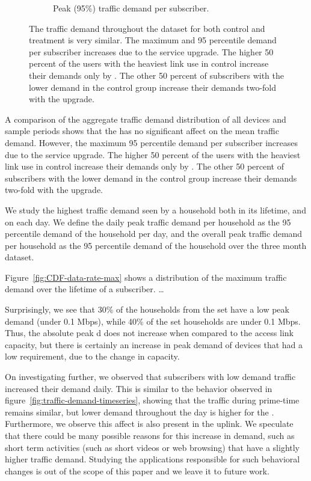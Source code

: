 \begin{figure}[t]
\begin{minipage}{1\linewidth}
\begin{subfigure}[b]{0.33\linewidth}
               \caption{Peak (95\%)
traffic demand per subscriber.\label{fig:CDF-data-rate-perc95}}
\end{subfigure}
%
\end{minipage}
\caption{The traffic demand throughout the dataset for both control and 
treatment is very similar. The maximum and 95 percentile 
demand per subscriber increases due to the service upgrade. The 
higher 50 percent of the users with the heaviest link use in control increase 
their demands only by . The other 50 percent of subscribers with the 
lower demand in the control group increase their demands two-fold with the 
upgrade.}
\label{fig:traffic-demand-cdf}
\end{figure}


A comparison of the aggregate traffic demand distribution of all devices 
and sample periods shows that the \treatment{} has no significant affect on the 
mean traffic demand. However, the maximum 95 percentile 
demand per subscriber increases due to the service upgrade. The 
higher 50 percent of the users with the heaviest link use in control increase 
their demands only by . The other 50 percent of subscribers with the 
lower demand in the control group increase their demands two-fold with the 
upgrade.

We study the highest traffic demand seen by a household both in its lifetime, 
and on each day. We define the daily peak traffic demand per household as the 
95 percentile demand of the household per day, and the overall peak traffic 
demand per household  as the 95 percentile demand of the household over the 
three month dataset.

Figure~\ref{fig:CDF-data-rate-max} shows a distribution of the maximum traffic 
demand over the lifetime of a subscriber. \dots

Surprisingly, we see that 30\% of the households from the \test set have a low 
peak demand (under 0.1 Mbps), while 40\% of the \control set households 
are under 0.1 Mbps. Thus, the absolute peak d does not increase when 
compared to the access link capacity, but there is certainly an increase in 
peak demand of devices that  had a low requirement, due to the change in 
capacity.

On investigating further, we observed that subscribers with low demand traffic 
increased their demand daily. This is similar to the behavior observed in 
figure~\ref{fig:traffic-demand-timeseries}, showing that the traffic during 
prime-time remains similar, but lower demand throughout the day  is higher for 
the \test. Furthermore, we observe this affect is also present in the uplink.
We speculate that there could be many possible reasons for this increase in 
demand, such as short term activities (such as short videos or web browsing) 
that have a slightly higher traffic demand. Studying the applications 
responsible for such behavioral changes is out of the scope of this paper and 
we leave it to future work.